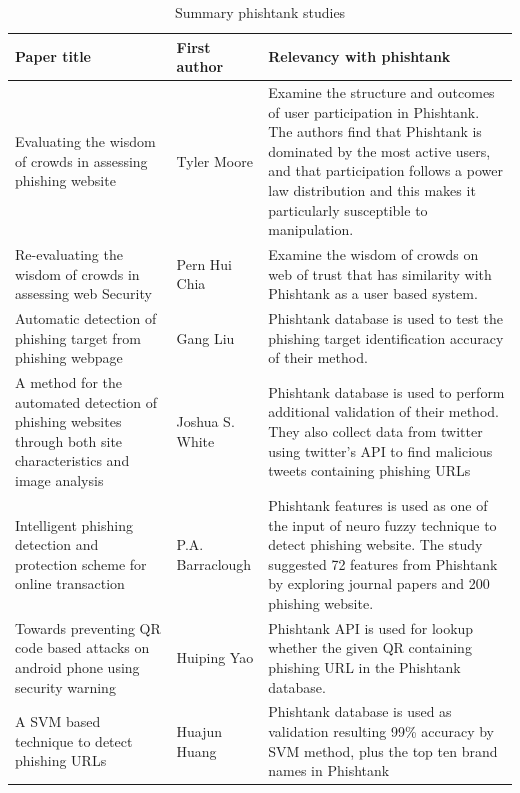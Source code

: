 \begin{longtable}{>{\raggedright}p{3cm}>{\raggedright}p{2cm}>{\raggedright}p{5cm}}
\caption{\label{tab:phishtank}Summary phishtank studies}
\tabularnewline
\toprule 
\textbf{\footnotesize{}Paper title} & \textbf{\footnotesize{}First author} & \textbf{\footnotesize{}Relevancy with phishtank}\tabularnewline
\midrule 
{\scriptsize{}Evaluating the wisdom of crowds in assessing phishing
website \citep{moore:2008}} & {\scriptsize{}Tyler Moore} & {\scriptsize{}Examine the structure and outcomes of user participation
in Phishtank. The authors find that Phishtank is dominated by the
most active users, and that participation follows a power law distribution
and this makes it particularly susceptible to manipulation.}\tabularnewline
\midrule 
{\scriptsize{}Re-evaluating the wisdom of crowds in assessing web
Security \citep{chia:2012}} & {\scriptsize{}Pern Hui Chia} & {\scriptsize{}Examine the wisdom of crowds on web of trust that has
similarity with Phishtank as a user based system.}\tabularnewline
\midrule 
{\scriptsize{}Automatic detection of phishing target from phishing
webpage \citep{liu:2010}} & {\scriptsize{}Gang Liu} & {\scriptsize{}Phishtank database is used to test the phishing target
identification accuracy of their method.}\tabularnewline
\midrule 
{\scriptsize{}A method for the automated detection of phishing websites
through both site characteristics and image analysis \citep{white:2012}} & {\scriptsize{}Joshua S. White} & {\scriptsize{}Phishtank database is used to perform additional validation
of their method. They also collect data from twitter using twitter\textquoteright s
API to find malicious tweets containing phishing URLs}\tabularnewline
\midrule 
{\scriptsize{}Intelligent phishing detection and protection scheme
for online transaction \citep{barraclough:2013}} & {\scriptsize{}P.A. Barraclough} & {\scriptsize{}Phishtank features is used as one of the input of neuro
fuzzy technique to detect phishing website. The study suggested 72
features from Phishtank by exploring journal papers and 200 phishing
website.}\tabularnewline
\midrule 
{\scriptsize{}Towards preventing QR code based attacks on android
phone using security warning \citep{yao:2013}} & {\scriptsize{}Huiping Yao} & {\scriptsize{}Phishtank API is used for lookup whether the given QR
containing phishing URL in the Phishtank database.}\tabularnewline
\midrule 
{\scriptsize{}A SVM based technique to detect phishing URLs \citep{huang:2012}} & {\scriptsize{}Huajun Huang} & {\scriptsize{}Phishtank database is used as validation resulting 99\%
accuracy by SVM method, plus the top ten brand names in Phishtank
}
\end{longtable}
